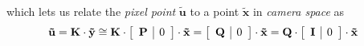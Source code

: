 which lets us relate the \textit{pixel point} $\mathbf{\tilde{u}}$ to a point $\mathbf{\tilde{x}}$ in \textit{camera space} as
\begin{equation*}
\begin{split}
\mathbf{\tilde{u}}&=\mathbf{K}\cdot\mathbf{\tilde{y}}
\cong\mathbf{K}\cdot\left[\begin{array}{c|c}\mathbf{P} & \vZero\end{array}\right]\cdot
\mathbf{\tilde{x}}
=\left[\begin{array}{c|c}\mathbf{Q}&\vZero\end{array}\right]\cdot
\mathbf{\tilde{x}}
=\mathbf{Q}\cdot\left[\begin{array}{c|c}\mathbf{I} & \vZero\end{array}\right]\cdot
\mathbf{\tilde{x}}
%

\end{split}
\end{equation*}
